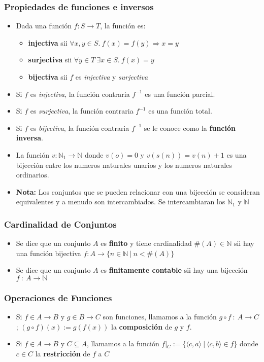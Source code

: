 \documentclass{beamer}
\begin{document}
\begin{frame}
\frametitle{Propiedades de funciones e inversos}
\begin{itemize}
\item{
    Dada una funci\'on $f:S\rightarrow T$, la funci\'on es:
    \begin{itemize}
        \item{{\bf injectiva} sii $\forall x,y\in S.\ f(x)=f(y)\Rightarrow x=y$}
        \item{{\bf surjectiva} sii $\forall y\in T\ \exists x\in S.\ f(x)=y$}
        \item{{\bf bijectiva} sii $f$ es \emph{injectiva} y \emph{surjectiva}}
    \end{itemize}
}
\item{Si $f$ es \emph{injectiva}, la funci\'on contraria $f^{-1}$ es una funci\'on parcial.}
\item{Si $f$ es \emph{surjectiva}, la funci\'on contraria $f^{-1}$ es una funci\'on total.}
\item{Si $f$ es \emph{bijectiva}, la funci\'on contraria $f^{-1}$ se le conoce como la {\bf funci\'on inversa}.}
\item{La funci\'on $v:\mathbb{N}_1\rightarrow \mathbb{N}$ donde $v(o)=0$ y $v(s(n))=v(n)+1$ es una
bijecci\'on entre los numeros naturales unarios y los numeros naturales ordinarios.}
\item{{\bf Nota:} Los conjuntos que se pueden relacionar con una bijecci\'on se consideran
equivalentes y a menudo son intercambiados. Se intercambiaran los $\mathbb{N}_1$ y $\mathbb{N}$}
\end{itemize}
\end{frame}

\begin{frame}
\frametitle{Cardinalidad de Conjuntos}
\begin{itemize}
    \item{Se dice que un conjunto $A$ es {\bf finito} y tiene cardinalidad $\#(A)\in \mathbb{N}$
    sii hay una funci\'on bijectiva $f:A\rightarrow \{n\in\mathbb{N}\ |\ n<\#(A)\}$ }
    \item{Se dice que un conjunto $A$ es {\bf finitamente contable} sii hay una bijecci\'on
    $f\ :\ A\rightarrow \mathbb{N}$}
\end{itemize}
\end{frame}

\begin{frame}
\frametitle{Operaciones de Funciones}
\begin{itemize}
    \item{Si $f\in A\rightarrow B$ y $g\in B\rightarrow C$ son funciones, llamamos a la funci\'on
    $g\circ f\ :\ A\rightarrow C$; $(g\circ f)(x):=g(f(x))$ la {\bf composici\'on} de $g$ y $f$.}
    \item{Si $f\in A\rightarrow B$ y $C\subseteq A$, llamamos a la funci\'on $f|_{C}:=\{ \langle c,a \rangle\ |
    \ \langle c,b \rangle \in f \}$ donde $c\in C$ la {\bf restricci\'on} de $f$ a $C$}
\end{itemize}
\end{frame}
\end{document}
